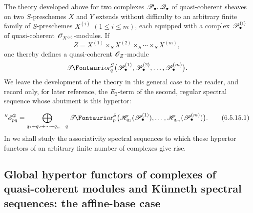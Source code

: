 \begin{env}[6.5.15]
\label{III.6.5.15}
The theory developed above for two complexes
$\mathscr{P}_\bullet,\mathscr{Q}_\bullet$ of quasi-coherent sheaves on two
$S$-preschemes $X$ and $Y$ extends without difficulty to an
arbitrary finite family of $S$-preschemes $X^{(i)}$
$(1\leq i\leq m)$, each equipped with a complex
$\mathscr{P}_\bullet^{(i)}$ of quasi-coherent
$\mathscr{O}_{X^{(i)}}$-modules.  If
\[
  Z=X^{(1)}\times_SX^{(2)}\times_S\cdots\times_SX^{(m)},
\]
one thereby defines a quasi-coherent $\mathscr{O}_Z$-module
\[
  \shTor_q^S
  \bigl(\sh P_\bullet^{(1)},\sh P_\bullet^{(2)},\ldots,
        \sh P_\bullet^{(m)}\bigr).
\]
We leave the development of the theory in this general case to
the reader, and record only, for later reference, the $E_2$-term
of the second, regular spectral sequence whose abutment is this
hypertor:


\[
  ''\sh E_{pq}^2
  =
  \bigoplus_{q_1+q_2+\cdots+q_m=q}
  \shTor_p^S
  \bigl(
    \sh H_{q_1}(\sh P_\bullet^{(1)}),\ldots,
    \sh H_{q_m}(\sh P_\bullet^{(m)})
  \bigr).
  \tag{6.5.15.1}\label{III.6.5.15.1}
\]
In  we shall study the associativity spectral
sequences to which these hypertor functors of an arbitrary
finite number of complexes give rise.
\end{env}

\subsection{Global hypertor functors of complexes of
quasi-coherent modules and K\"unneth spectral sequences: the
affine-base case}
\label{subsection:III.6.6}

